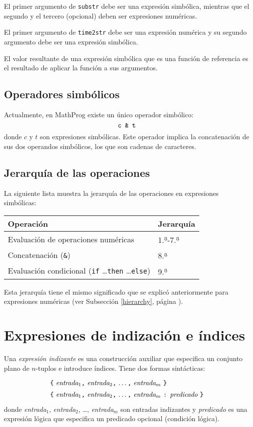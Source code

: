 \documentclass[11pt,spanish]{report}
\begin{document}
El primer argumento de {\tt substr} debe ser una expresión simbólica, mientras que el segundo y el tercero (opcional) deben ser expresiones numéricas.

El primer argumento de {\tt time2str} debe ser una expresión numérica y su segundo argumento debe ser una expresión simbólica.

El valor resultante de una expresión simbólica que es una función de referencia es el resultado de aplicar la función a sus argumentos.

\subsection{Operadores simbólicos}

Actualmente, en MathProg existe un único operador simbólico:
$$\mbox{\tt c \& t}$$
donde $c$ y $t$ son expresiones simbólicas. Este operador implica la concatenación de sus dos operandos simbólicos, los que son cadenas de caracteres.

\subsection{Jerarquía de las operaciones}

La siguiente lista muestra la jerarquía de las operaciones en expresiones simbólicas:

\noindent\hfil
\begin{tabular}{@{}ll@{}}
Operación&Jerarquía\\
\hline
Evaluación de operaciones numéricas&
1.{\textsuperscript{\b{a}}}-7.{\textsuperscript{\b{a}}}\\
Concatenación ({\tt\&})&
8.{\textsuperscript{\b{a}}}\\
Evaluación condicional ({\tt if} \dots {\tt then} \dots {\tt else})&
9.{\textsuperscript{\b{a}}}\\
\end{tabular}

Esta jerarquía tiene el mismo significado que se explicó anteriormente para expresiones numéricas (ver Subsección \ref{hierarchy}, página \pageref{hierarchy}).

\section{Expresiones de indización e índices}
\label{indexing}

Una {\it expresión indizante} es una construcción auxiliar que especifica un conjunto plano de $n$-tuplos e introduce índices. Tiene dos formas sintácticas:
$$
{\def\arraystretch{1.4}
\begin{array}{l}
\mbox{{\tt\{} {\it entrada}$_1${\tt,} {\it entrada}$_2${\tt,} \dots{\tt,}
{\it entrada}$_m$ {\tt\}}}\\
\mbox{{\tt\{} {\it entrada}$_1${\tt,} {\it entrada}$_2${\tt,} \dots{\tt,}
{\it entrada}$_m$ {\tt:} {\it predicado} {\tt\}}}\\
\end{array}
}
$$
donde {\it entrada}{$_1$}, {\it entrada}{$_2$}, \dots, {\it entrada}{$_m$}
son entradas indizantes y {\it predicado} es una expresión lógica que especifica un predicado opcional (condición lógica).
\end{document}
